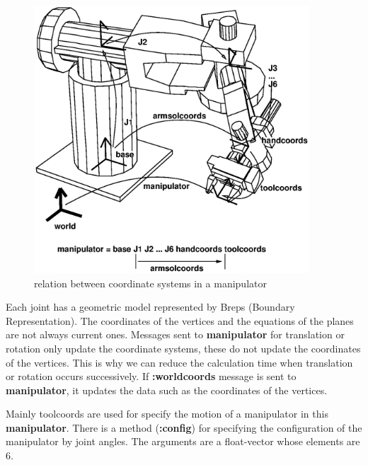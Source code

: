 \begin{figure}
\begin{center}
\includegraphics[height=100mm]{fig/eta3coords.ps}
\end{center}
\caption{\label{JointCoords}
relation between coordinate systems in a manipulator}

\end{figure}

Each joint has a geometric model represented by Breps (Boundary Representation).
The coordinates of the vertices and the equations of the planes are not always 
current ones. Messages sent to {\bf manipulator} for translation or rotation only
update the coordinate systems, these do not update the coordinates of the 
vertices. This is why we can reduce the calculation time when translation or 
rotation occurs successively. If {\bf :worldcoords} message is sent to 
{\bf manipulator}, it updates the data such as the coordinates of the vertices.


Mainly toolcoords are used for specify the motion of a manipulator in 
this {\bf manipulator}. There is a method ({\bf :config}) for specifying the 
configuration of the manipulator by joint angles. The arguments are a 
float-vector whose elements are 6.

